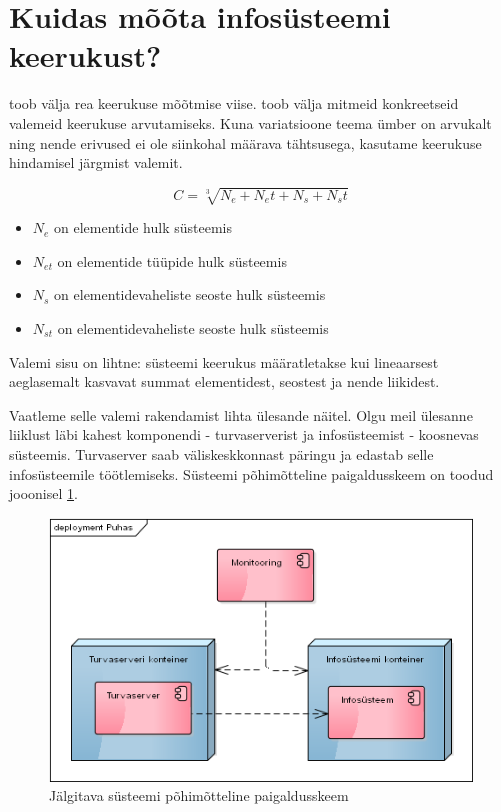 \documentclass{tufte-book}
\begin{document}
\section{Kuidas mõõta infosüsteemi keerukust?}
\label{sec:complexity}
\cite{mitchell2009complexity} toob välja rea keerukuse mõõtmise viise. \citeauthor{crawley2015systems}\cite{crawley2015systems} toob välja mitmeid konkreetseid valemeid keerukuse arvutamiseks. Kuna variatsioone teema ümber on arvukalt ning nende erivused ei ole siinkohal määrava tähtsusega, kasutame keerukuse hindamisel järgmist valemit. 

\begin{equation}
	C = \sqrt[3]{N_e + N_et + N_s + N_st}
	\label{eq:complexity}
\end{equation}

\begin{itemize}
	\item $N_e$ on elementide hulk süsteemis
	\item $N_{et}$ on elementide tüüpide hulk süsteemis
	\item $N_s$ on elementidevaheliste seoste hulk süsteemis
	\item $N_{st}$ on elementidevaheliste seoste hulk süsteemis
\end{itemize}

Valemi sisu on lihtne: süsteemi keerukus määratletakse kui lineaarsest aeglasemalt kasvavat summat elementidest, seostest ja nende liikidest. 

Vaatleme selle valemi rakendamist lihta ülesande näitel. Olgu meil ülesanne liiklust läbi kahest komponendi - turvaserverist ja infosüsteemist - koosnevas süsteemis. Turvaserver saab väliskeskkonnast päringu ja edastab selle infosüsteemile töötlemiseks. Süsteemi põhimõtteline paigaldusskeem on toodud jooonisel \ref{fig:complexity:pure}.

\begin{figure}[htp]
	\begin{center}
		\includegraphics[width=.6\textwidth]{puhas.png}
		\caption{Jälgitava süsteemi põhimõtteline paigaldusskeem}
		\label{fig:complexity:pure}
	\end{center}
\end{figure}
\end{document}
